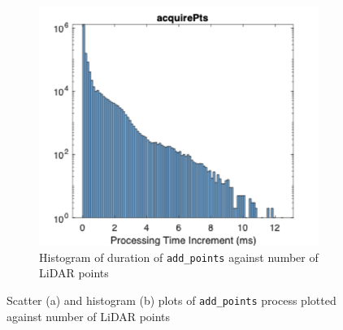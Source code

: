 \documentclass[../main.tex]{subfiles}
\begin{document}
\begin{figure}[htbp]
{\begin{subfigure}[t]{0.44\textwidth}
        \includegraphics[width=\textwidth]{Images/gbcache/Add_points_hist.png}
        \caption{Histogram of duration of \texttt{add\_points} against number of LiDAR points}
        \label{fig:gbcache_add_points_hist}
    \end{subfigure}
}
\caption{Scatter (a) and histogram (b) plots of \texttt{add\_points} process plotted against number of LiDAR points}
\label{fig:gbcache_add_points}
\end{figure}
\end{document}
